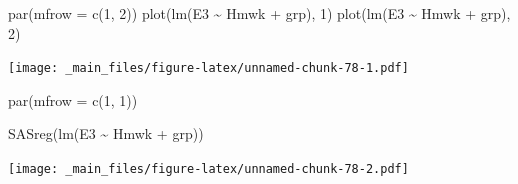 \documentclass[
]{book}
\newenvironment{Shaded}{\begin{snugshade}}{\end{snugshade}}
\newcommand{\AttributeTok}[1]{\textcolor[rgb]{0.77,0.63,0.00}{#1}}
\newcommand{\DecValTok}[1]{\textcolor[rgb]{0.00,0.00,0.81}{#1}}
\newcommand{\FunctionTok}[1]{\textcolor[rgb]{0.00,0.00,0.00}{#1}}
\newcommand{\NormalTok}[1]{#1}
\newcommand{\SpecialCharTok}[1]{\textcolor[rgb]{0.00,0.00,0.00}{#1}}
\begin{document}
\begin{Shaded}
\begin{Highlighting}[]
\FunctionTok{par}\NormalTok{(}\AttributeTok{mfrow =} \FunctionTok{c}\NormalTok{(}\DecValTok{1}\NormalTok{, }\DecValTok{2}\NormalTok{))}
\FunctionTok{plot}\NormalTok{(}\FunctionTok{lm}\NormalTok{(E3 }\SpecialCharTok{\textasciitilde{}}\NormalTok{ Hmwk }\SpecialCharTok{+}\NormalTok{ grp), }\DecValTok{1}\NormalTok{)}
\FunctionTok{plot}\NormalTok{(}\FunctionTok{lm}\NormalTok{(E3 }\SpecialCharTok{\textasciitilde{}}\NormalTok{ Hmwk }\SpecialCharTok{+}\NormalTok{ grp), }\DecValTok{2}\NormalTok{)}
\end{Highlighting}
\end{Shaded}

\texttt{[image: \_main\_files/figure-latex/unnamed-chunk-78-1.pdf]}

\begin{Shaded}
\begin{Highlighting}[]
\FunctionTok{par}\NormalTok{(}\AttributeTok{mfrow =} \FunctionTok{c}\NormalTok{(}\DecValTok{1}\NormalTok{, }\DecValTok{1}\NormalTok{))}

\FunctionTok{SASreg}\NormalTok{(}\FunctionTok{lm}\NormalTok{(E3 }\SpecialCharTok{\textasciitilde{}}\NormalTok{ Hmwk }\SpecialCharTok{+}\NormalTok{ grp))}
\end{Highlighting}
\end{Shaded}

\texttt{[image: \_main\_files/figure-latex/unnamed-chunk-78-2.pdf]}
\end{document}
